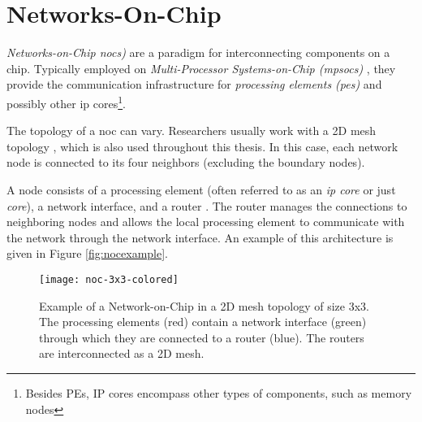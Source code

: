 
\section{Networks-On-Chip}\label{sec:networkonchipfun}
\textit{Networks-on-Chip \glspl{noc})} are a paradigm for interconnecting components on a chip. Typically employed on
\textit{Multi-Processor Systems-on-Chip (\glspl{mpsoc})} \cites(e.g.)(){ivanov05nocintroduction}{biswas15routerattack}{tatas16designingnocs}, they
provide the communication infrastructure for \textit{processing elements (\glspl{pe})} and possibly other \gls{ip} cores\footnote{Besides PEs, IP
cores encompass other types of components, such as memory nodes}.

The topology of a \gls{noc} can vary. Researchers usually work with a 2D mesh topology
\cites(e.g.)(){frey17hardenednoc}{kumar02networkonchip}{fernandes16nocrouting}{boraten16packetsecurity}, which is also used throughout this thesis.
In this case, each network node is connected to its four neighbors (excluding the boundary nodes).

A node consists of a processing element (often referred to as an \textit{\gls{ip} core} or just \textit{core}), a network interface,
and a router \cite{dally01routepacketsnotwires}. The router manages the connections to neighboring nodes and allows
the local processing element to communicate with the network through the network interface. An example of this architecture is given in Figure
\vref{fig:nocexample}.

\begin{figure}
    \centering
    \texttt{[image: noc-3x3-colored]}
    \caption[Example of a 3x3 mesh NoC]{Example of a Network-on-Chip in a 2D mesh topology of size 3x3. The processing elements (red) contain a network interface
    (green) through which they are connected to a router (blue). The routers are interconnected as a 2D mesh.}
    \label{fig:nocexample}
\end{figure}

